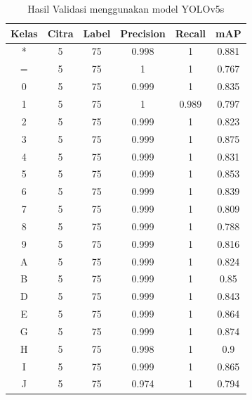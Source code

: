 \begin{center}
  \begin{longtable}[c]{|c|c|c|c|c|c|}
    \caption{Hasil Validasi menggunakan model YOLOv5s}
    \label{tb:valresultyolov5s}\\
    \hline
    \textbf{Kelas} & \textbf{Citra} & \textbf{Label} & \textbf{Precision} & \textbf{Recall} & \textbf{mAP} \\ \hline
    \endhead
    *      & 5      & 75     & 0.998      & 1      & 0.881    \\ \hline
    =      & 5      & 75     & 1          & 1      & 0.767    \\ \hline
    0      & 5      & 75     & 0.999      & 1      & 0.835    \\ \hline
    1      & 5      & 75     & 1          & 0.989  & 0.797    \\ \hline
    2      & 5      & 75     & 0.999      & 1      & 0.823    \\ \hline
    3      & 5      & 75     & 0.999      & 1      & 0.875    \\ \hline
    4      & 5      & 75     & 0.999      & 1      & 0.831    \\ \hline
    5      & 5      & 75     & 0.999      & 1      & 0.853    \\ \hline
    6      & 5      & 75     & 0.999      & 1      & 0.839    \\ \hline
    7      & 5      & 75     & 0.999      & 1      & 0.809    \\ \hline
    8      & 5      & 75     & 0.999      & 1      & 0.788    \\ \hline
    9      & 5      & 75     & 0.999      & 1      & 0.816    \\ \hline
    A      & 5      & 75     & 0.999      & 1      & 0.824    \\ \hline
    B      & 5      & 75     & 0.999      & 1      & 0.85     \\ \hline
    D      & 5      & 75     & 0.999      & 1      & 0.843    \\ \hline
    E      & 5      & 75     & 0.999      & 1      & 0.864    \\ \hline
    G      & 5      & 75     & 0.999      & 1      & 0.874    \\ \hline
    H      & 5      & 75     & 0.998      & 1      & 0.9      \\ \hline
    I      & 5      & 75     & 0.999      & 1      & 0.865    \\ \hline
    J      & 5      & 75     & 0.974      & 1      & 0.794    \\ \hline

\end{longtable}
\end{center}
